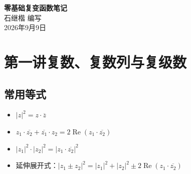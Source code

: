 \documentclass{article}
\begin{document}
	\begin{center}
		{\LARGE \textbf{零基础复变函数笔记}} \\[0.5cm]
		{\large {\kaishu 石继楷 \quad 编写}} \\[0.3cm]
		{\normalsize 2026年9月9日}
	\end{center}
	\tableofcontents
	\newpage
	\section{第一讲\quad 复数、复数列与复级数}
	\subsection*{常用等式}
	
	\begin{itemize}
		\item $|z|^2 = z \cdot \overline{z}$
		\item $z_1 \cdot \overline{z_2} + \overline{z_1} \cdot z_2 = 2\operatorname{Re}(z_1 \cdot \overline{z_2})$
		\item $|z_1|^2 \cdot |z_2|^2 = |z_1 \cdot \overline{z_2}|^2$
		\item 延伸展开式：$|z_1 \pm z_2|^2 = |z_1|^2 + |z_2|^2 \pm 2\operatorname{Re}(z_1 \cdot \overline{z_2})$
	\end{itemize}
	
	
\end{document}

